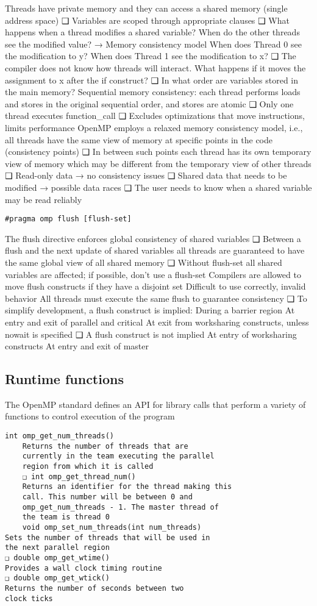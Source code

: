 Threads have private memory and they can access
a shared memory (single address space)
❑ Variables are scoped through appropriate clauses
❑ What happens when a thread modifies a shared
variable? When do the other threads see the
modified value? → Memory consistency model
When does Thread 0 see the modification to y?
When does Thread 1 see the modification to x?
❑ The compiler does not know how threads will
interact. What happens if it moves the
assignment to x after the if construct?
❑ In what order are variables stored in the main
memory?
Sequential memory consistency: each thread
performs loads and stores in the original
sequential order, and stores are atomic
❑ Only one thread executes function_call
❑ Excludes optimizations that move instructions,
limits performance
OpenMP employs a relaxed memory consistency
model, i.e., all threads have the same view of
memory at specific points in the code
(consistency points)
❑ In between such points each thread has its own
temporary view of memory which may be
different from the temporary view of other
threads
❑ Read-only data → no consistency issues
❑ Shared data that needs to be modified →
possible data races
❑ The user needs to know when a shared variable
may be read reliably

\begin{lstlisting}[style=C]
#pragma omp flush [flush-set]
\end{lstlisting}
The flush directive enforces global consistency
of shared variables
❑ Between a flush and the next update of shared
variables all threads are guaranteed to have the
same global view of all shared memory
❑ Without flush-set all shared variables are
affected; if possible, don't use a flush-set
Compilers are allowed to move flush
constructs if they have a disjoint set
Difficult to use correctly, invalid behavior
All threads must execute the same flush to
guarantee consistency
❑ To simplify development, a flush construct is
implied:
During a barrier region
At entry and exit of parallel and critical
At exit from worksharing constructs, unless
nowait is specified
❑ A flush construct is not implied
At entry of worksharing constructs
At entry and exit of master


\subsection{Runtime functions}
The OpenMP standard defines an API for library
calls that perform a variety of functions to control
execution of the program
\begin{lstlisting}[style=C]
    int omp_get_num_threads()
    Returns the number of threads that are
    currently in the team executing the parallel
    region from which it is called
    ❑ int omp_get_thread_num()
    Returns an identifier for the thread making this
    call. This number will be between 0 and
    omp_get_num_threads - 1. The master thread of
    the team is thread 0
    void omp_set_num_threads(int num_threads)
Sets the number of threads that will be used in
the next parallel region
❑ double omp_get_wtime()
Provides a wall clock timing routine
❑ double omp_get_wtick()
Returns the number of seconds between two
clock ticks
\end{lstlisting}

